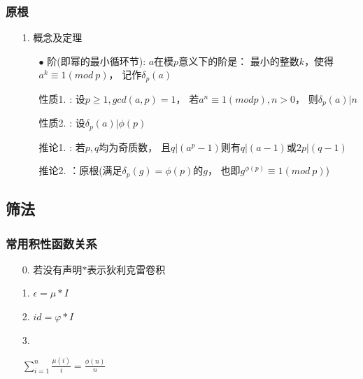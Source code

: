 \documentclass[UTF8]{article}
\begin{document}
\subsubsection{原根}
\begin{enumerate}
	\item[1.]概念及定理
	\begin{enumerate}
		\item[$\bullet$] 阶(即幂的最小循环节): $a$在模$p$意义下的阶是： 最小的整数$k$，使得$a^k \equiv 1(mod\ p)$， 记作$\delta_p(a)$
		
		\item[性质1.]: 设$p\ge 1, gcd(a, p)=1$， 若$a^n\equiv 1(mod p), n > 0$， 则$\delta_p(a) | n$
		
		\item[性质2.]: 设$\delta_p(a)|\phi(p)$
		
		\item[推论1.]: 若$p, q$均为奇质数， 且$q|(a^p-1)$则有$q|(a-1)$或$2p|(q-1)$
		
		\item[推论2.]：原根(满足$\delta_p(g) = \phi(p)$的$g$， 也即$g^{\phi(p)} \equiv 1(mod\ p)$)
	\end{enumerate}
\end{enumerate}

\subsection{筛法}

\subsubsection{常用积性函数关系}
\begin{enumerate}
	\item[0.] 若没有声明$*$表示狄利克雷卷积
	\item[1.] $\epsilon = \mu * I$
	\item[2.] $id = \varphi * I$
	\item[3.] \begin{Large} $\sum_{i=1}^n \frac{\mu{(i)}}{i} = \frac{\phi{(n)}}{n}$\end{Large}
\end{enumerate}
\end{document}
